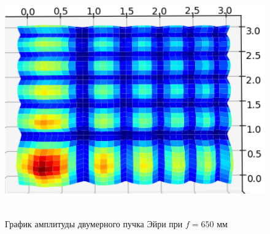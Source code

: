 {    \vspace{0.6cm}

    \begin{figure}[H]
        \centering
        \includegraphics[height = 10cm]{plots/ai3d}
        \vspace{0.4cm}
        \caption{График амплитуды двумерного пучка Эйри при $f = 650$ мм}
        \label{ai3d}
    \end{figure}
    }\label{sec:моделирование-трехмерной-картины-распространения-пучков}


    \newpage
    \titleformat{\section}{\bfseries\centering}{\thesection}{0.5em}{\MakeUppercase}

